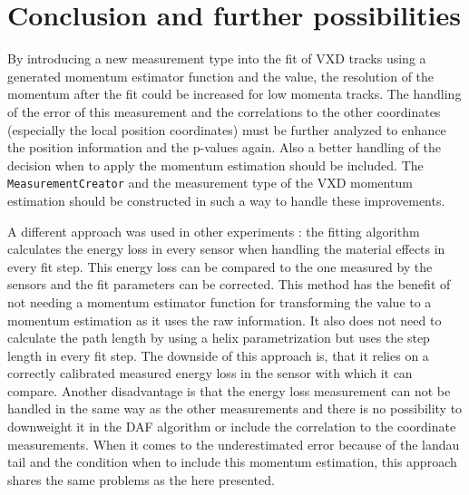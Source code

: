 \section{Conclusion and further possibilities}

By introducing a new measurement type into the fit of VXD tracks using a generated momentum estimator function and the \dedx value, the resolution of the momentum after the fit could be increased for low momenta tracks. The handling of the error of this measurement and the correlations to the other coordinates (especially the local position coordinates) must be further analyzed to enhance the position information and the p-values again. Also a better handling of the decision when to apply the momentum estimation should be included. The \texttt{MeasurementCreator} and the measurement type of the VXD momentum estimation should be constructed in such a way to handle these improvements.

A different approach was used in other experiments \cite{sergey}: the fitting algorithm calculates the energy loss in every sensor when handling the material effects in every fit step. This energy loss can be compared to the one measured by the sensors and the fit parameters can be corrected. This method has the benefit of not needing a momentum estimator function for transforming the \dedx value to a momentum estimation as it uses the raw \dedx information. It also does not need to calculate the path length by using a helix parametrization but uses the step length in every fit step. The downside of this approach is, that it relies on a correctly calibrated measured energy loss in the sensor with which it can compare. Another disadvantage is that the energy loss measurement can not be handled in the same way as the other measurements and there is no possibility to downweight it in the DAF algorithm or include the correlation to the coordinate measurements. When it comes to the underestimated error because of the landau tail and the condition when to include this momentum estimation, this approach shares the same problems as the here presented.

